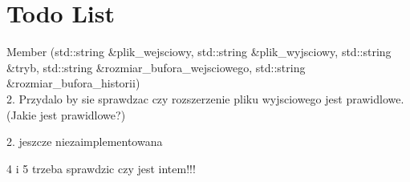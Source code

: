 \chapter{Todo List}
\hypertarget{todo}{}\label{todo}

\begin{DoxyRefList}
\item[Member \doxylink{funkcje_8h_ab8cd35ef1106eb46b7658ea6f98f2ccb}{sprawdzenie\+\_\+poprawnosci} (std\+::string \&plik\+\_\+wejsciowy, std\+::string \&plik\+\_\+wyjsciowy, std\+::string \&tryb, std\+::string \&rozmiar\+\_\+bufora\+\_\+wejsciowego, std\+::string \&rozmiar\+\_\+bufora\+\_\+historii)]\hfill \\
\label{todo__todo000001}%
%
2. Przydalo by sie sprawdzac czy rozszerzenie pliku wyjsciowego jest prawidlowe. (Jakie jest prawidlowe?) 



2. jeszcze niezaimplementowana 



4 i 5 trzeba sprawdzic czy jest intem!!!
\end{DoxyRefList}
